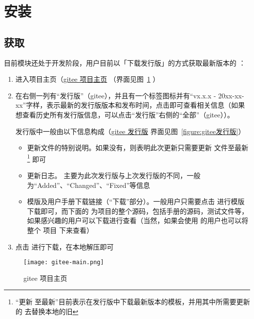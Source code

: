 
\section{安装}

\subsection{获取 }

目前模块还处于开发阶段，用户目前以「下载发行版」的方式获取最新版本的 ：

\begin{enumerate}
  \item 进入项目主页（\href{https://gitee.com/zepinglee/exam-zh}{gitee 项目主页} （界面见图~\ref{figure:gitee项目主页} ）
  \item 在右侧一列有“发行版”（gitee），并且有一个标签图标并有“vx.x.x - 20xx-xx-xx”字样，表示最新的发行版版本和发布时间，点击即可查看相关信息（如果想查看历史所有发行版信息，可以点击“发行版”右侧的“全部”（gitee））。
  
    发行版中一般由以下信息构成（\href{https://gitee.com/zepinglee/exam-zh/releases}{gitee 发行版} 界面见图~\ref{figure:gitee发行版}）
      \begin{itemize}
        \item 更新文件的特别说明。如果没有，则表明此次更新只需要更新  文件至最新\footnote{“更新  至最新”目前表示在发行版中下载最新版本的模板，并用其中所需要更新的  去替换本地的旧 } 即可
        \item 更新日志。 主要为此次发行版与上次发行版的不同，一般为“Added”、“Changed”、“Fixed”等信息
        \item 模版及用户手册下载链接（“下载”部分）。一般用户只需要点击  进行模版下载即可，而下面的  为项目的整个源码，包括手册的源码，测试文件等，如果感兴趣的用户可以下载进行查看（当然，如果会使用  的用户也可以将整个  项目  下来查看）
      \end{itemize}
  \item 点击  进行下载，在本地解压即可
\end{enumerate}


\begin{figure}[htbp]
  \centering
  \texttt{[image: gitee-main.png]}
  \caption{gitee 项目主页}
  \label{figure:gitee项目主页}
\end{figure}


